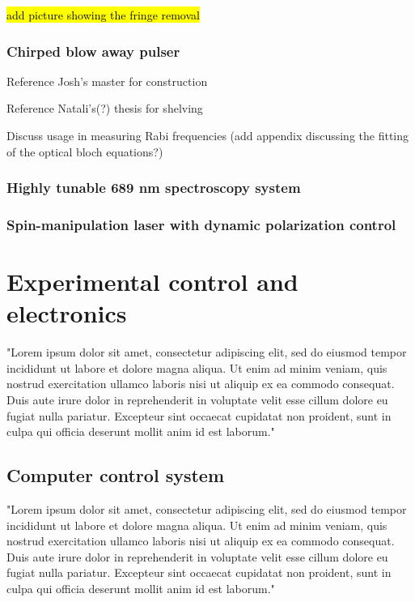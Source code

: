 \hl{add picture showing the fringe removal}

\subsubsection{Chirped blow away pulser}



Reference Josh's master for construction

Reference Natali's(?) thesis for shelving

Discuss usage in measuring Rabi frequencies (add appendix discussing the fitting of the optical bloch equations?)

\subsubsection{Highly tunable 689 nm spectroscopy system}

\subsubsection{Spin-manipulation laser with dynamic polarization control}

\section{Experimental control and electronics}
\label{sec:electronics}

"Lorem ipsum dolor sit amet, consectetur adipiscing elit, sed do eiusmod tempor incididunt ut labore et dolore magna aliqua. Ut enim ad minim veniam, quis nostrud exercitation ullamco laboris nisi ut aliquip ex ea commodo consequat. Duis aute irure dolor in reprehenderit in voluptate velit esse cillum dolore eu fugiat nulla pariatur. Excepteur sint occaecat cupidatat non proident, sunt in culpa qui officia deserunt mollit anim id est laborum."

\subsection{Computer control system}
\label{ssec:comp_sys}

"Lorem ipsum dolor sit amet, consectetur adipiscing elit, sed do eiusmod tempor incididunt ut labore et dolore magna aliqua. Ut enim ad minim veniam, quis nostrud exercitation ullamco laboris nisi ut aliquip ex ea commodo consequat. Duis aute irure dolor in reprehenderit in voluptate velit esse cillum dolore eu fugiat nulla pariatur. Excepteur sint occaecat cupidatat non proident, sunt in culpa qui officia deserunt mollit anim id est laborum."

